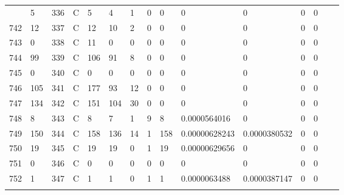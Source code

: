 \begin{longtable}{lllllllllllllll}
\begin{comment}
	741 & 5                 & 336 & C   & 5                 & 4                 & 1                 & 0    & 0          & 0              & 0              & 0             & 0            \\
	742 & 12                & 337 & C   & 12                & 10                & 2                 & 0    & 0          & 0              & 0              & 0             & 0            \\
	743 & 0                 & 338 & C   & 11                & 0                 & 0                 & 0    & 0          & 0              & 0              & 0             & 0            \\
	744 & 99                & 339 & C   & 106               & 91                & 8                 & 0    & 0          & 0              & 0              & 0             & 0            \\
	745 & 0                 & 340 & C   & 0                 & 0                 & 0                 & 0    & 0          & 0              & 0              & 0             & 0            \\
	746 & 105               & 341 & C   & 177               & 93                & 12                & 0    & 0          & 0              & 0              & 0             & 0            \\
	747 & 134               & 342 & C   & 151               & 104               & 30                & 0    & 0          & 0              & 0              & 0             & 0            \\
	748 & 8                 & 343 & C   & 8                 & 7                 & 1                 & 9    & 8          & 0.0000564016   & 0              & 0             & 0            \\
	749 & 150               & 344 & C   & 158               & 136               & 14                & 1    & 158        & 0.00000628243  & 0.0000380532   & 0             & 0            \\
	750 & 19                & 345 & C   & 19                & 19                & 0                 & 1    & 19         & 0.00000629656  & 0              & 0             & 0            \\
	751 & 0                 & 346 & C   & 0                 & 0                 & 0                 & 0    & 0          & 0              & 0              & 0             & 0            \\
	752 & 1                 & 347 & C   & 1                 & 1                 & 0                 & 1    & 1          & 0.0000063488   & 0.0000387147   & 0             & 0            \\

\end{comment}
\end{longtable}
